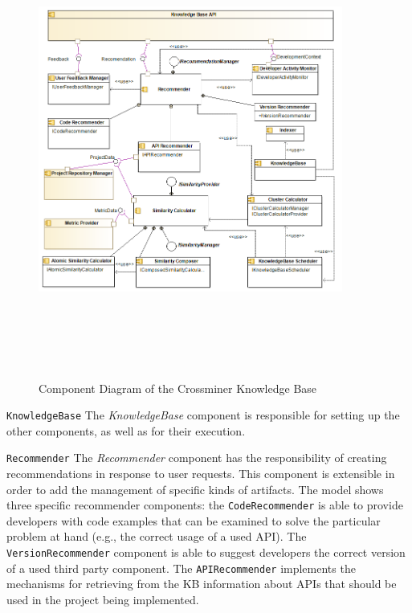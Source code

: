 \begin{figure}[H]
\includegraphics[width=10cm,height=15cm,keepaspectratio]{images/logicView.png}
\centering
\caption{Component Diagram of the Crossminer Knowledge Base}
\label{fig:CrossminerComponent}
\end{figure}

\texttt{KnowledgeBase}  The \textit{KnowledgeBase} component is responsible for setting up the other components, as well as for their execution.

\texttt{Recommender} The \textit{Recommender} component has the responsibility of creating recommendations in response to user requests. This component is extensible in order to add the management of specific kinds of artifacts. The model shows three specific recommender components: the \texttt{CodeRecommender} is able to provide developers with code examples that can be examined to solve the particular problem at hand (e.g., the correct usage of a used API). The \texttt{VersionRecommender} component is able to suggest developers the correct version of a used third party component. The \texttt{APIRecommender} implements the mechanisms for retrieving from the KB information about APIs that should be used in the project being implemented.



